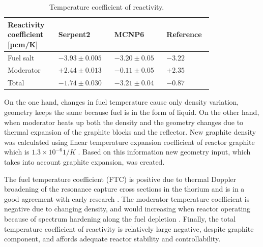 \documentclass{anstrans}
\begin{document}
\captionsetup[table]{
  labelsep = newline,
  name = TABLE, 
  justification=justified,
  singlelinecheck=false,%
  labelsep=colon,%
  skip = \medskipamount}
\begin{table}[h!]
\begin{tabular}{p{0.22\linewidth} p{0.22\linewidth} p{0.21\linewidth} p{0.15\linewidth}} \toprule
   Reactivity coefficient [pcm/K]  & Serpent2      & MCNP6 \cite{park_whole_2015}   & Reference \cite{robertson_conceptual_1971}      
\\ \midrule
Fuel salt        & $-3.93\pm0.005$ & $-3.20\pm0.05$ & $-3.22$ 
\\ \midrule
Moderator        & $+2.44\pm0.013$ & $-0.11\pm0.05$ & $+2.35$ 
\\ \midrule
Total            & $-1.74\pm0.030$ & $-3.21\pm0.04$ & $-0.87$ 
\\
\bottomrule
\end{tabular}
  \caption{Temperature coefficient of reactivity.}
  \label{tab:tcoef}
\end{table}
On the one hand, changes in fuel temperature cause only density variation, geometry keeps the same because fuel is in the form of liquid. On the other hand, when moderator heats up both the density and the geometry changes due to thermal expansion of the graphite blocks and the reflector. New graphite density was calculated using linear temperature expansion coefficient of reactor graphite which is $1.3\times10^{-6}1/K$ \cite{robertson_conceptual_1971}. Based on this information new geometry input, which takes into account graphite expansion, was created.

The fuel temperature coefficient (FTC) is positive due to thermal Doppler broadening of the resonance capture cross sections in the thorium and is in a good agreement with early research \cite{robertson_conceptual_1971,park_whole_2015}. The moderator temperature coefficient is negative due to changing density, and would increasing when reactor operating because of spectrum hardening along the fuel depletion \cite{park_whole_2015}. Finally, the total temperature coefficient of reactivity is relatively large negative, despite graphite component, and affords adequate reactor stability and controllability.
\end{document}
